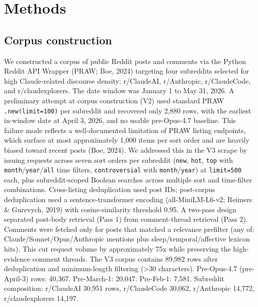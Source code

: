 \documentclass{obelus-preprint}
\begin{document}
\section{Methods}
\subsection{Corpus construction}
We constructed a corpus of public Reddit posts and comments via the Python Reddit API Wrapper (PRAW; Boe, 2024) targeting four subreddits selected for high Claude-related discourse density: r/ClaudeAI, r/Anthropic, r/ClaudeCode, and r/claudexplorers. The date window was January 1 to May 31, 2026.
A preliminary attempt at corpus construction (V2) used standard PRAW \texttt{.new(limit=100)} per subreddit and recovered only 2,880 rows, with the earliest in-window date at April 3, 2026, and no usable pre-Opus-4.7 baseline. This failure mode reflects a well-documented limitation of PRAW listing endpoints, which surface at most approximately 1,000 items per sort order and are heavily biased toward recent posts (Boe, 2024). We addressed this in the V3 scrape by issuing requests across seven sort orders per subreddit (\texttt{new}, \texttt{hot}, \texttt{top} with \texttt{month}/\texttt{year}/\texttt{all} time filters, \texttt{controversial} with \texttt{month}/\texttt{year}) at \texttt{limit=500} each, plus subreddit-scoped Boolean searches across multiple sort and time-filter combinations. Cross-listing deduplication used post IDs; post-corpus deduplication used a sentence-transformer encoding (all-MiniLM-L6-v2; Reimers \& Gurevych, 2019) with cosine-similarity threshold 0.95.
A two-pass design separated post-body retrieval (Pass 1) from comment-thread retrieval (Pass 2). Comments were fetched only for posts that matched a relevance prefilter (any of: Claude/Sonnet/Opus/Anthropic mentions plus sleep/temporal/affective lexicon hits). This cut request volume by approximately 75x while preserving the high-evidence comment threads.
The V3 corpus contains 89,982 rows after deduplication and minimum-length filtering (\textgreater{}30 characters). Pre-Opus-4.7 (pre-April-3) rows: 40,367. Pre-March-1: 20,047. Pre-Feb-1: 7,581. Subreddit composition: r/ClaudeAI 30,951 rows, r/ClaudeCode 30,062, r/Anthropic 14,772, r/claudexplorers 14,197.
\end{document}
